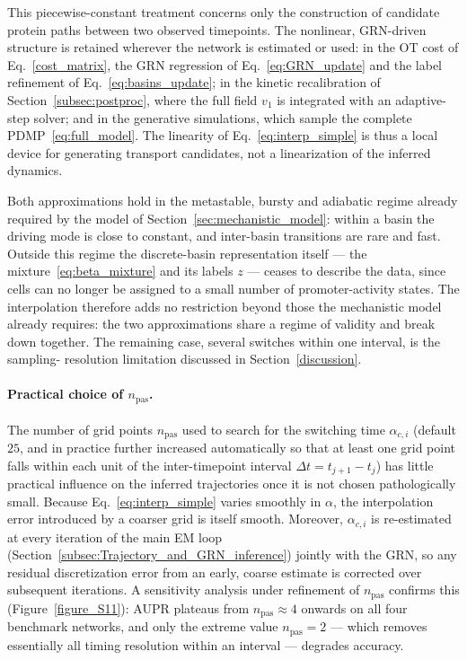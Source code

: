 \documentclass[a4paper, 11pt]{article}
\theoremstyle{plain}
\theoremstyle{remark}
\newcommand*{\firstreview}[1]{{\color{black}#1}}
\begin{document}
\begin{appendices}
\firstreview{This piecewise-constant treatment concerns only the construction of candidate
protein paths between two observed timepoints. The nonlinear, GRN-driven structure is retained
wherever the network is estimated or used: in the OT cost of Eq.~\eqref{cost_matrix}, the GRN
regression of Eq.~\eqref{eq:GRN_update} and the label refinement of
Eq.~\eqref{eq:basins_update}; in the kinetic recalibration of Section~\ref{subsec:postproc},
where the full field $v_1$ is integrated with an adaptive-step solver; and in the generative
simulations, which sample the complete PDMP~\eqref{eq:full_model}. The linearity of
Eq.~\eqref{eq:interp_simple} is thus a local device for generating transport candidates, not a
linearization of the inferred dynamics.}

\firstreview{Both approximations hold in the metastable, bursty and adiabatic regime already
required by the model of Section~\ref{sec:mechanistic_model}: within a basin the driving mode is
close to constant, and inter-basin transitions are rare and fast. Outside this regime the
discrete-basin representation itself --- the mixture~\eqref{eq:beta_mixture} and its labels $z$
--- ceases to describe the data, since cells can no longer be assigned to a small number of
promoter-activity states. The interpolation therefore adds no restriction beyond those the
mechanistic model already requires: the two approximations share a regime of validity and break
down together. The remaining case, several switches within one interval, is the sampling-
resolution limitation discussed in Section~\ref{discussion}.}

\paragraph{Practical choice of $n_{\mathrm{pas}}$.}
\firstreview{The number of grid points $n_{\mathrm{pas}}$ used to search for the switching
time $\alpha_{c,i}$ (default $25$, and in practice further increased automatically so that at
least one grid point falls within each unit of the inter-timepoint interval
$\Delta t = t_{j+1}-t_j$) has little practical influence on the inferred trajectories once it
is not chosen pathologically small. Because Eq.~\eqref{eq:interp_simple} varies smoothly
in $\alpha$, the interpolation error introduced by a coarser grid is itself
smooth. Moreover, $\alpha_{c,i}$ is
re-estimated at every iteration of the main EM loop
(Section~\ref{subsec:Trajectory_and_GRN_inference}) jointly with the GRN, so any residual
discretization error from an early, coarse estimate is corrected over subsequent iterations.
A sensitivity analysis under refinement of $n_{\mathrm{pas}}$ confirms this
(Figure~\ref{figure_S11}): AUPR plateaus from $n_{\mathrm{pas}} \approx 4$ onwards on all four
benchmark networks, and only the extreme value $n_{\mathrm{pas}} = 2$ — which removes
essentially all timing resolution within an interval — degrades accuracy.}


\end{appendices}
\end{document}
